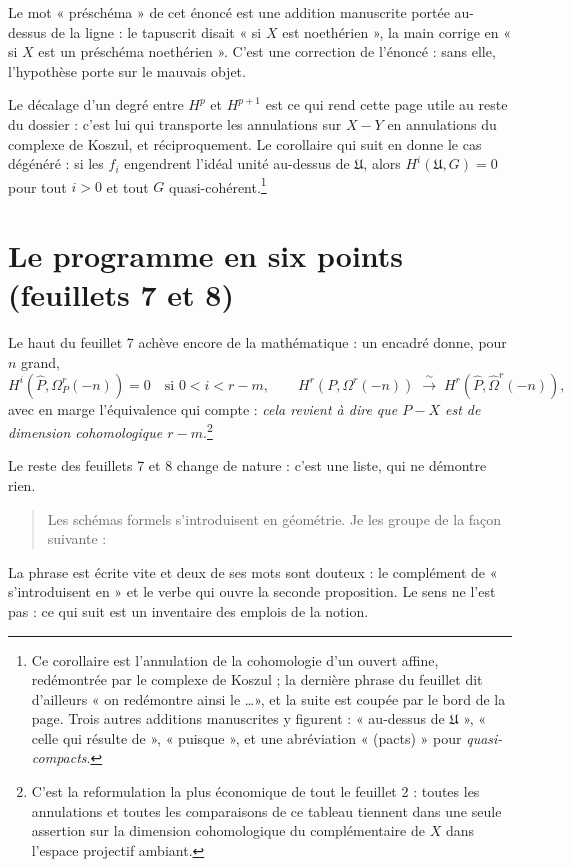 \documentclass[11pt,a4paper]{article}
\begin{document}
Le mot « préschéma » de cet énoncé est une addition manuscrite portée
au-dessus de la ligne : le tapuscrit disait « si $X$ est noethérien », la main
corrige en « si $X$ est un préschéma noethérien ». C'est une correction de l'énoncé : sans elle, l'hypothèse porte
sur le mauvais objet.

Le décalage d'un degré entre $H^{p}$ et $H^{p+1}$ est ce qui rend cette page
utile au reste du dossier : c'est lui qui transporte les annulations sur
$X - Y$ en annulations du complexe de Koszul, et réciproquement. Le corollaire
qui suit en donne le cas dégénéré : si les $f_{i}$ engendrent l'idéal unité
au-dessus de $\mathfrak{U}$, alors $H^{i}(\mathfrak{U}, G) = 0$ pour tout
$i > 0$ et tout $G$ quasi-cohérent.\footnote{Ce corollaire est
l'annulation de la cohomologie d'un ouvert affine, redémontrée par le complexe
de Koszul ; la dernière phrase du feuillet dit d'ailleurs « on redémontre ainsi
le \ldots », et la suite est coupée par le bord de la page. Trois autres
additions manuscrites y figurent : « au-dessus de $\mathfrak{U}$ », « celle qui
résulte de », « puisque », et une abréviation « (pacts) » pour
\emph{quasi-compacts}.}

\section*{Le programme en six points (feuillets 7 et 8)}

Le haut du feuillet 7 achève encore de la mathématique : un encadré donne,
pour $n$ grand,
\[
  H^{i}\!\left(\widehat{P}, \Omega^{r}_{P}(-n)\right) = 0
  \quad \text{si } 0 < i < r-m,
  \qquad
  H^{r}\!\left(P, \Omega^{r}(-n)\right) \;\xrightarrow{\ \sim\ }\;
  H^{r}\!\left(\widehat{P}, \widehat{\Omega}^{r}(-n)\right),
\]
avec en marge l'équivalence qui compte : \emph{cela revient à dire que
$P - X$ est de dimension cohomologique $r - m$}.\footnote{C'est la
reformulation la plus économique de tout le feuillet 2 : toutes les
annulations et toutes les comparaisons de ce tableau tiennent dans une seule
assertion sur la dimension cohomologique du complémentaire de $X$ dans
l'espace projectif ambiant.}

Le reste des feuillets 7 et 8 change de nature : c'est une liste, qui ne
démontre rien.

\begin{quote}
Les schémas formels s'introduisent en géométrie. Je les groupe de la façon
suivante :
\end{quote}

La phrase est écrite vite et deux de ses mots sont douteux : le complément de
« s'introduisent en » et le verbe qui ouvre la seconde proposition. Le sens ne l'est pas : ce qui suit est un inventaire des emplois de la notion.
\end{document}
